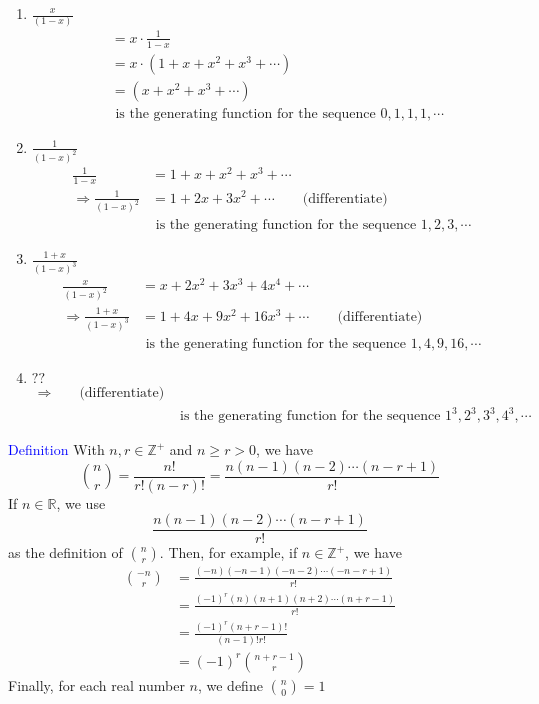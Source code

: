 \documentclass[a4paper]{article}
\begin{document}
\begin{enumerate}
    \item $\frac{x}{(1-x)}$
    \begin{align*}
        &=x\cdot\frac{1}{1-x}\\
        &=x\cdot(1+x+x^2+x^3+\cdots)\\
        &=(x+x^2+x^3+\cdots)\\
        &\text{ is the generating function for the sequence } 0,1,1,1,\cdots
    \end{align*}
    
    \item $\frac{1}{(1-x)^2}$
    \begin{align*}
        \frac{1}{1-x}&=1+x+x^2+x^3+\cdots\\
        \Rightarrow \frac{1}{(1-x)^2}&=1+2x+3x^2+\cdots\qquad\text{(differentiate)}\\
        &\text{ is the generating function for the sequence } 1,2,3,\cdots
    \end{align*}
    
    \item $\frac{1+x}{(1-x)^3}$
    \begin{align*}
        \frac{x}{(1-x)^2}&=x+2x^2+3x^3+4x^4+\cdots\\
        \Rightarrow \frac{1+x}{(1-x)^3}&=1+4x+9x^2+16x^3+\cdots\qquad\text{(differentiate)}\\
        &\text{ is the generating function for the sequence } 1,4,9,16,\cdots
    \end{align*}
    
    \item $??$
    \begin{align*}
        \Rightarrow \qquad\text{(differentiate)}\\
        &\text{ is the generating function for the sequence } 1^3,2^3,3^3,4^3,\cdots
    \end{align*}
\end{enumerate}

\textcolor{blue}{Definition} With $n,r\in\mathbb{Z}^+$ and $n\geq r>0$, we have
$$\binom{n}{r}=\frac{n!}{r!(n-r)!}=\frac{n(n-1)(n-2)\cdots(n-r+1)}{r!}$$
If $n\in\mathbb{R}$, we use
$$\frac{n(n-1)(n-2)\cdots(n-r+1)}{r!}$$
as the definition of $\binom{n}{r}$. Then, for example, if $n\in\mathbb{Z}^+$, we have
\begin{align*}
\binom{-n}{r}&=\frac{(-n)(-n-1)(-n-2)\cdots(-n-r+1)}{r!}\\
&=\frac{(-1)^r(n)(n+1)(n+2)\cdots(n+r-1)}{r!}\\
&=\frac{(-1)^r(n+r-1)!}{(n-1)!r!}\\
&=(-1)^r\binom{n+r-1}{r}
\end{align*}
Finally, for each real number $n$, we define $\binom{n}{0}=1$
\end{document}
